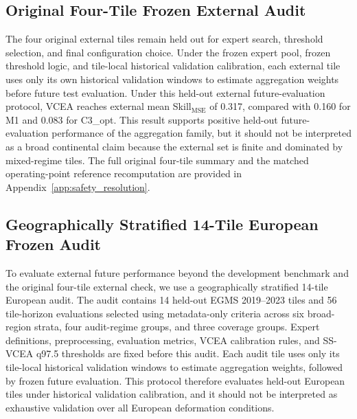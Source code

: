 \documentclass[lettersize,journal]{IEEEtran}
\newcommand{\skillmse}{Skill$_{\mathrm{MSE}}$}
\begin{document}
\subsection{Original Four-Tile Frozen External Audit}
The four original external tiles remain held out for expert search, threshold selection, and final configuration choice. Under the frozen expert pool, frozen threshold logic, and tile-local historical validation calibration, each external tile uses only its own historical validation windows to estimate aggregation weights before future test evaluation. Under this held-out external future-evaluation protocol, VCEA reaches external mean \skillmse{} of 0.317, compared with 0.160 for M1 and 0.083 for C3\_opt. This result supports positive held-out future-evaluation performance of the aggregation family, but it should not be interpreted as a broad continental claim because the external set is finite and dominated by mixed-regime tiles. The full original four-tile summary and the matched operating-point reference recomputation are provided in Appendix~\ref{app:safety_resolution}.

\subsection{Geographically Stratified 14-Tile European Frozen Audit}
To evaluate external future performance beyond the development benchmark and the original four-tile external check, we use a geographically stratified 14-tile European audit. The audit contains 14 held-out EGMS 2019--2023 tiles and 56 tile-horizon evaluations selected using metadata-only criteria across six broad-region strata, four audit-regime groups, and three coverage groups. Expert definitions, preprocessing, evaluation metrics, VCEA calibration rules, and SS-VCEA q97.5 thresholds are fixed before this audit. Each audit tile uses only its tile-local historical validation windows to estimate aggregation weights, followed by frozen future evaluation. This protocol therefore evaluates held-out European tiles under historical validation calibration, and it should not be interpreted as exhaustive validation over all European deformation conditions.
\end{document}
